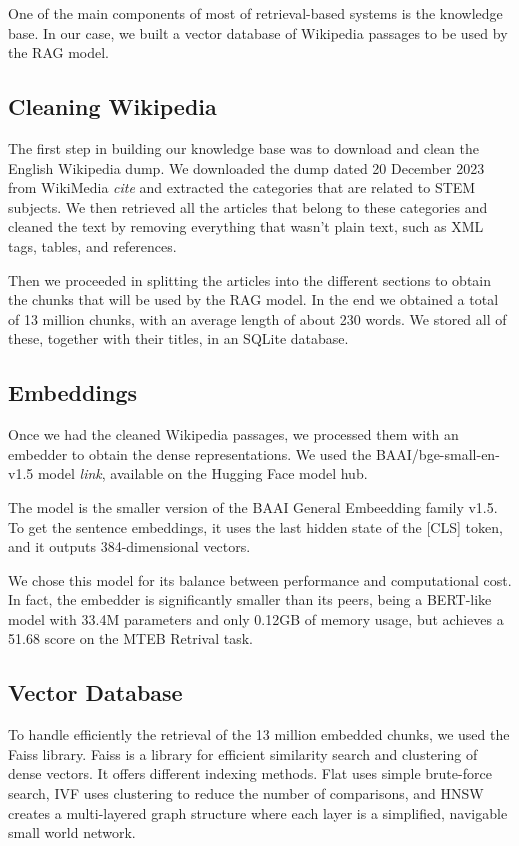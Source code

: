 \documentclass[11pt]{article}
\begin{document}
One of the main components of most of retrieval-based systems is the knowledge base.
In our case, we built a vector database of Wikipedia passages to be used by the RAG model.

\subsection{Cleaning Wikipedia}

The first step in building our knowledge base was to download and clean the English
Wikipedia dump. We downloaded the dump dated 20 December 2023 from WikiMedia \textit{cite} 
and extracted the categories that are related to STEM subjects. 
We then retrieved all the articles that belong to these categories and cleaned the text
by removing everything that wasn't plain text, such as XML tags, tables, and references.

Then we proceeded in splitting the articles into the different sections to obtain the chunks 
that will be used by the RAG model. 
In the end we obtained a total of 13 million chunks, with an average length of about 230 words.
We stored all of these, together with their titles, in an SQLite database.

\subsection{Embeddings}

Once we had the cleaned Wikipedia passages, we processed them with an embedder to obtain the dense 
representations.
We used the BAAI/bge-small-en-v1.5 model \textit{link}, available on the Hugging Face model hub.

The model is the smaller version of the BAAI General Embeedding family v1.5. 
To get the sentence embeddings, it uses the last hidden state of the [CLS] token, and it outputs 
384-dimensional vectors.

We chose this model for its balance between performance and computational cost.
In fact, the embedder is significantly smaller than its peers, being a BERT-like model with 33.4M 
parameters and only 0.12GB of memory usage, but achieves a 51.68 score on the MTEB Retrival task.



\subsection{Vector Database}

To handle efficiently the retrieval of the 13 million embedded chunks, we used the Faiss library. 
Faiss is a library for efficient similarity search and clustering of dense vectors. 
It offers different indexing methods. Flat uses simple brute-force search, 
IVF uses clustering to reduce the number of comparisons,
and HNSW creates a multi-layered graph structure where each layer is a simplified, 
navigable small world network. 
\end{document}
